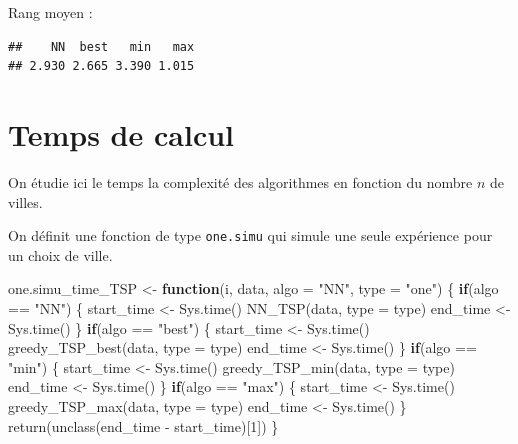 \documentclass[
]{article}
\newenvironment{Shaded}{\begin{snugshade}}{\end{snugshade}}
\newcommand{\AttributeTok}[1]{\textcolor[rgb]{0.77,0.63,0.00}{#1}}
\newcommand{\ControlFlowTok}[1]{\textcolor[rgb]{0.13,0.29,0.53}{\textbf{#1}}}
\newcommand{\DecValTok}[1]{\textcolor[rgb]{0.00,0.00,0.81}{#1}}
\newcommand{\FunctionTok}[1]{\textcolor[rgb]{0.00,0.00,0.00}{#1}}
\newcommand{\NormalTok}[1]{#1}
\newcommand{\OtherTok}[1]{\textcolor[rgb]{0.56,0.35,0.01}{#1}}
\newcommand{\SpecialCharTok}[1]{\textcolor[rgb]{0.00,0.00,0.00}{#1}}
\newcommand{\StringTok}[1]{\textcolor[rgb]{0.31,0.60,0.02}{#1}}
\begin{document}
Rang moyen :

\begin{verbatim}
##    NN  best   min   max 
## 2.930 2.665 3.390 1.015
\end{verbatim}

\hypertarget{temps-de-calcul}{%
\section{Temps de calcul}\label{temps-de-calcul}}

On étudie ici le temps la complexité des algorithmes en fonction du
nombre \(n\) de villes.

On définit une fonction de type \texttt{one.simu} qui simule une seule
expérience pour un choix de ville.

\begin{Shaded}
\begin{Highlighting}[]
\NormalTok{one.simu\_time\_TSP }\OtherTok{\textless{}{-}} \ControlFlowTok{function}\NormalTok{(i, data, }\AttributeTok{algo =} \StringTok{"NN"}\NormalTok{, }\AttributeTok{type =} \StringTok{"one"}\NormalTok{)}
\NormalTok{\{}
  \ControlFlowTok{if}\NormalTok{(algo }\SpecialCharTok{==} \StringTok{"NN"}\NormalTok{)}
\NormalTok{  \{}
\NormalTok{    start\_time }\OtherTok{\textless{}{-}} \FunctionTok{Sys.time}\NormalTok{()}
    \FunctionTok{NN\_TSP}\NormalTok{(data, }\AttributeTok{type =}\NormalTok{ type)}
\NormalTok{    end\_time  }\OtherTok{\textless{}{-}} \FunctionTok{Sys.time}\NormalTok{()}
\NormalTok{  \}}
  \ControlFlowTok{if}\NormalTok{(algo }\SpecialCharTok{==} \StringTok{"best"}\NormalTok{)}
\NormalTok{  \{}
\NormalTok{    start\_time }\OtherTok{\textless{}{-}} \FunctionTok{Sys.time}\NormalTok{()}
    \FunctionTok{greedy\_TSP\_best}\NormalTok{(data, }\AttributeTok{type =}\NormalTok{ type)}
\NormalTok{    end\_time  }\OtherTok{\textless{}{-}} \FunctionTok{Sys.time}\NormalTok{()}
\NormalTok{  \}}
  \ControlFlowTok{if}\NormalTok{(algo }\SpecialCharTok{==} \StringTok{"min"}\NormalTok{)}
\NormalTok{  \{}
\NormalTok{    start\_time }\OtherTok{\textless{}{-}} \FunctionTok{Sys.time}\NormalTok{()}
    \FunctionTok{greedy\_TSP\_min}\NormalTok{(data, }\AttributeTok{type =}\NormalTok{ type)}
\NormalTok{    end\_time  }\OtherTok{\textless{}{-}} \FunctionTok{Sys.time}\NormalTok{()}
\NormalTok{  \}}
  \ControlFlowTok{if}\NormalTok{(algo }\SpecialCharTok{==} \StringTok{"max"}\NormalTok{)}
\NormalTok{  \{}
\NormalTok{    start\_time }\OtherTok{\textless{}{-}} \FunctionTok{Sys.time}\NormalTok{()}
    \FunctionTok{greedy\_TSP\_max}\NormalTok{(data, }\AttributeTok{type =}\NormalTok{ type)}
\NormalTok{    end\_time  }\OtherTok{\textless{}{-}} \FunctionTok{Sys.time}\NormalTok{()}
\NormalTok{  \}}
  \FunctionTok{return}\NormalTok{(}\FunctionTok{unclass}\NormalTok{(end\_time }\SpecialCharTok{{-}}\NormalTok{ start\_time)[}\DecValTok{1}\NormalTok{])}
\NormalTok{\}}
\end{Highlighting}
\end{Shaded}
\end{document}
